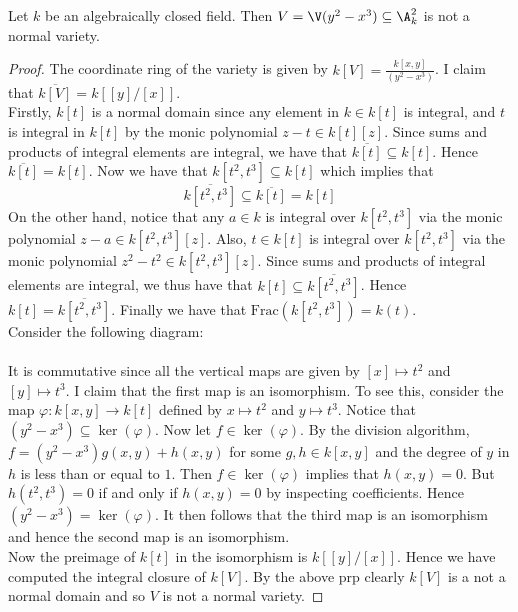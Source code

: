 \documentclass[a4paper]{article}
\begin{document}
\begin{eg}{}{} Let $k$ be an algebraically closed field. Then $V=\V(y^2-x^3)\subseteq\A_k^2$ is not a normal variety. 
\begin{proof}
The coordinate ring of the variety is given by $k[V]=\frac{k[x,y]}{(y^2-x^3)}$. I claim that $\overline{k[V]}=k[[y]/[x]]$. \\

Firstly, $k[t]$ is a normal domain since any element in $k\in k[t]$ is integral, and $t$ is integral in $k[t]$ by the monic polynomial $z-t\in k[t][z]$. Since sums and products of integral elements are integral, we have that $\overline{k[t]}\subseteq k[t]$. Hence $\overline{k[t]}=k[t]$. Now we have that $k[t^2,t^3]\subseteq k[t]$ which implies that $$\overline{k[t^2,t^3]}\subseteq\overline{k[t]}=k[t]$$ On the other hand, notice that any $a\in k$ is integral over $k[t^2,t^3]$ via the monic polynomial $z-a\in k[t^2,t^3][z]$. Also, $t\in k[t]$ is integral over $k[t^2,t^3]$ via the monic polynomial $z^2-t^2\in k[t^2,t^3][z]$. Since sums and products of integral elements are integral, we thus have that $k[t]\subseteq\overline{k[t^2,t^3]}$. Hence $k[t]=\overline{k[t^2,t^3]}$. Finally we have that $\text{Frac}(k[t^2,t^3])=k(t)$. \\

Consider the following diagram: \\
 \\
It is commutative since all the vertical maps are given by $[x]\mapsto t^2$ and $[y]\mapsto t^3$. I claim that the first map is an isomorphism. To see this, consider the map $\varphi:k[x,y]\to k[t]$ defined by $x\mapsto t^2$ and $y\mapsto t^3$. Notice that $(y^2-x^3)\subseteq\ker(\varphi)$. Now let $f\in\ker(\varphi)$. By the division algorithm, $f=(y^2-x^3)g(x,y)+h(x,y)$ for some $g,h\in k[x,y]$ and the degree of $y$ in $h$ is less than or equal to $1$. Then $f\in\ker(\varphi)$ implies that $h(x,y)=0$. But $h(t^2,t^3)=0$ if and only if $h(x,y)=0$ by inspecting coefficients. Hence $(y^2-x^3)=\ker(\varphi)$. It then follows that the third map is an isomorphism and hence the second map is an isomorphism. \\

Now the preimage of $k[t]$ in the isomorphism is $k[[y]/[x]]$. Hence we have computed the integral closure of $k[V]$. By the above prp clearly $k[V]$ is a not a normal domain and so $V$ is not a normal variety. 
\end{proof}
\end{eg}
\end{document}
